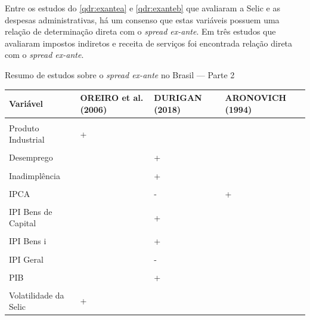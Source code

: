 \documentclass[
  12pt,
  12pt,
  openright,
  oneside,
  a4paper,
  chapter=TITLE,
  section=TITLE,
  subsection=TITLE,
  subsubsection=TITLE,
  portugues,
  sumario=tradicional]{abntex2}
\begin{document}
Entre os estudos do \autoref{qdr:exantea} e \autoref{qdr:exanteb} que avaliaram a Selic e as despesas administrativas, há um consenso que estas variáveis possuem uma relação de determinação direta com o \emph{spread ex-ante}. Em três estudos que avaliaram impostos indiretos e receita de serviços foi encontrada relação direta com o \emph{spread ex-ante}.

\begin{qdr}
\vspace{20pt}
\caption{Resumo de estudos sobre o \emph{spread ex-ante} no Brasil — Parte 2}
\vspace{1mm}
\begingroup\fontsize{10}{12}\selectfont

\begin{tabu} to 
\toprule
Variável & OREIRO et al. (2006) & DURIGAN (2018) & ARONOVICH (1994)\\
\midrule
{} &  &  & \\
Produto Industrial & + &  & \\
 &  &  & \\
Desemprego &  & + & \\
 &  &  & \\
\addlinespace
Inadimplência &  & + & \\
 &  &  & \\
IPCA &  & - & +\\
 &  &  & \\
IPI Bens de Capital &  & + & \\
\addlinespace
{} &  &  & \\
IPI Bens i &  & + & \\
 &  &  & \\
IPI Geral &  & - & \\
 &  &  & \\
\addlinespace
PIB &  & + & \\
 &  &  & \\
Volatilidade da Selic & + &  & \\
\bottomrule
\end{tabu}
\endgroup{}
\vspace{1mm}
\label{qdr:exanteb}
\vspace{-2mm}
\end{qdr}
\end{document}
